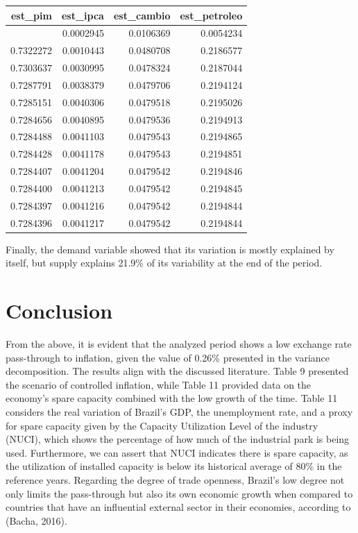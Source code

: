 \documentclass[12pt]{article}
\begin{document}
\begin{longtable}[]{@{}rrrr@{}}
\toprule\noalign{}
est\_pim & est\_ipca & est\_cambio & est\_petroleo \\
\midrule\noalign{}
\endhead
\bottomrule\noalign{}
\endlastfoot
0.9836452 & 0.0002945 & 0.0106369 & 0.0054234 \\
0.7322272 & 0.0010443 & 0.0480708 & 0.2186577 \\
0.7303637 & 0.0030995 & 0.0478324 & 0.2187044 \\
0.7287791 & 0.0038379 & 0.0479706 & 0.2194124 \\
0.7285151 & 0.0040306 & 0.0479518 & 0.2195026 \\
0.7284656 & 0.0040895 & 0.0479536 & 0.2194913 \\
0.7284488 & 0.0041103 & 0.0479543 & 0.2194865 \\
0.7284428 & 0.0041178 & 0.0479543 & 0.2194851 \\
0.7284407 & 0.0041204 & 0.0479542 & 0.2194846 \\
0.7284400 & 0.0041213 & 0.0479542 & 0.2194845 \\
0.7284397 & 0.0041216 & 0.0479542 & 0.2194844 \\
0.7284396 & 0.0041217 & 0.0479542 & 0.2194844 \\
\end{longtable}

Finally, the demand variable showed that its variation is mostly
explained by itself, but supply explains 21.9\% of its variability at
the end of the period.

\hypertarget{conclusion}{%
\section{Conclusion}\label{conclusion}}

From the above, it is evident that the analyzed period shows a low
exchange rate pass-through to inflation, given the value of 0.26\%
presented in the variance decomposition. The results align with the
discussed literature. Table 9 presented the scenario of controlled
inflation, while Table 11 provided data on the economy's spare capacity
combined with the low growth of the time. Table 11 considers the real
variation of Brazil's GDP, the unemployment rate, and a proxy for spare
capacity given by the Capacity Utilization Level of the industry (NUCI),
which shows the percentage of how much of the industrial park is being
used. Furthermore, we can assert that NUCI indicates there is spare
capacity, as the utilization of installed capacity is below its
historical average of 80\% in the reference years. Regarding the degree
of trade openness, Brazil's low degree not only limits the pass-through
but also its own economic growth when compared to countries that have an
influential external sector in their economies, according to (Bacha,
2016).
\end{document}
